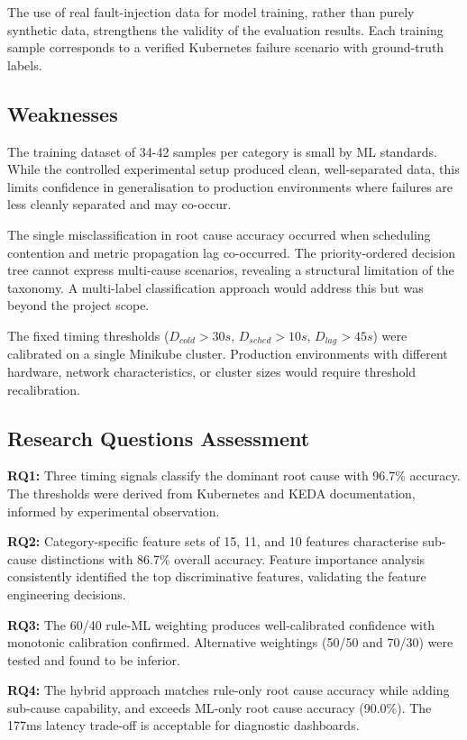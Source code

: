 The use of real fault-injection data for model training, rather than purely synthetic data, strengthens the validity of the evaluation results. Each training sample corresponds to a verified Kubernetes failure scenario with ground-truth labels.

\subsection{Weaknesses}
The training dataset of 34-42 samples per category is small by ML standards. While the controlled experimental setup produced clean, well-separated data, this limits confidence in generalisation to production environments where failures are less cleanly separated and may co-occur.

The single misclassification in root cause accuracy occurred when scheduling contention and metric propagation lag co-occurred. The priority-ordered decision tree cannot express multi-cause scenarios, revealing a structural limitation of the taxonomy. A multi-label classification approach would address this but was beyond the project scope.

The fixed timing thresholds ($D_{cold} > 30s$, $D_{sched} > 10s$, $D_{lag} > 45s$) were calibrated on a single Minikube cluster. Production environments with different hardware, network characteristics, or cluster sizes would require threshold recalibration.

\subsection{Research Questions Assessment}
\textbf{RQ1:} Three timing signals classify the dominant root cause with 96.7\% accuracy. The thresholds were derived from Kubernetes and KEDA documentation, informed by experimental observation.

\textbf{RQ2:} Category-specific feature sets of 15, 11, and 10 features characterise sub-cause distinctions with 86.7\% overall accuracy. Feature importance analysis consistently identified the top discriminative features, validating the feature engineering decisions.

\textbf{RQ3:} The 60/40 rule-ML weighting produces well-calibrated confidence with monotonic calibration confirmed. Alternative weightings (50/50 and 70/30) were tested and found to be inferior.

\textbf{RQ4:} The hybrid approach matches rule-only root cause accuracy while adding sub-cause capability, and exceeds ML-only root cause accuracy (90.0\%). The 177ms latency trade-off is acceptable for diagnostic dashboards.

